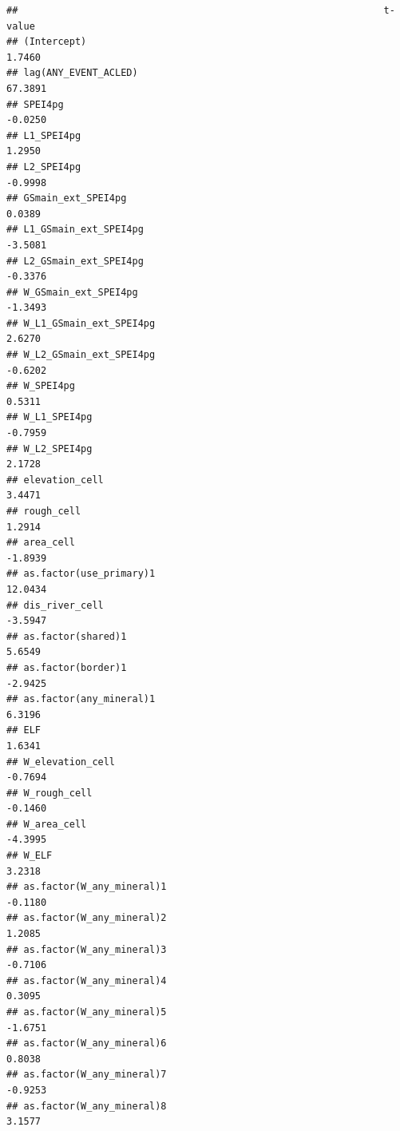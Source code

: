 \documentclass[
  a4paper,
]{article}
\begin{document}
\begin{verbatim}
##                                                                t-value
## (Intercept)                                                     1.7460
## lag(ANY_EVENT_ACLED)                                           67.3891
## SPEI4pg                                                        -0.0250
## L1_SPEI4pg                                                      1.2950
## L2_SPEI4pg                                                     -0.9998
## GSmain_ext_SPEI4pg                                              0.0389
## L1_GSmain_ext_SPEI4pg                                          -3.5081
## L2_GSmain_ext_SPEI4pg                                          -0.3376
## W_GSmain_ext_SPEI4pg                                           -1.3493
## W_L1_GSmain_ext_SPEI4pg                                         2.6270
## W_L2_GSmain_ext_SPEI4pg                                        -0.6202
## W_SPEI4pg                                                       0.5311
## W_L1_SPEI4pg                                                   -0.7959
## W_L2_SPEI4pg                                                    2.1728
## elevation_cell                                                  3.4471
## rough_cell                                                      1.2914
## area_cell                                                      -1.8939
## as.factor(use_primary)1                                        12.0434
## dis_river_cell                                                 -3.5947
## as.factor(shared)1                                              5.6549
## as.factor(border)1                                             -2.9425
## as.factor(any_mineral)1                                         6.3196
## ELF                                                             1.6341
## W_elevation_cell                                               -0.7694
## W_rough_cell                                                   -0.1460
## W_area_cell                                                    -4.3995
## W_ELF                                                           3.2318
## as.factor(W_any_mineral)1                                      -0.1180
## as.factor(W_any_mineral)2                                       1.2085
## as.factor(W_any_mineral)3                                      -0.7106
## as.factor(W_any_mineral)4                                       0.3095
## as.factor(W_any_mineral)5                                      -1.6751
## as.factor(W_any_mineral)6                                       0.8038
## as.factor(W_any_mineral)7                                      -0.9253
## as.factor(W_any_mineral)8                                       3.1577

\end{verbatim}
\end{document}
